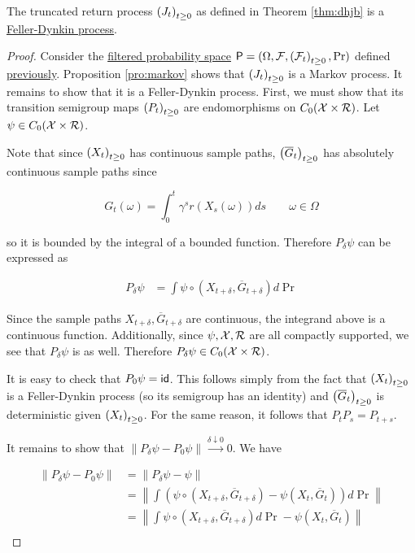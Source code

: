 \begin{lemma}\label{lem:generator}
  The truncated return process $\indexedabove{t}{J}$ as defined in
  Theorem \ref{thm:dhjb} is a \hyperref[def:fd]{Feller-Dynkin process}.
\end{lemma}
\begin{proof}
  Consider the \hyperref[def:filtration]{filtered probability space}
  $\mathsf{P} = (\Omega, \mathcal{F},
  \indexedabove{t}{\mathcal{F}}, \Pr)$ defined
  \hyperref[def:probability-space]{previously}. Proposition
  \ref{pro:markov} shows that $\indexedabove{t}{J}$ is a Markov process. It remains to
  show that it is a Feller-Dynkin process. First, we must show that
  its transition semigroup maps $\indexedabove{t}{P}$ are
  endomorphisms on $C_0(\mathcal{X}\times\returnspace)$. Let
  $\psi\in C_0(\mathcal{X}\times\returnspace)$.

  Note that since $\indexedabove{t}{X}$ has continuous sample paths,
  $\indexedabove{t}{\overline{G}}$ has absolutely continuous sample
  paths since

  \begin{equation*}
    G_t(\omega) = \int_0^t\gamma^sr(X_s(\omega))ds \qquad
    \omega\in\Omega
  \end{equation*}

  so it is bounded by the integral of a bounded function. Therefore
  $P_\delta\psi$ can be expressed as

  \begin{align*}
    P_\delta\psi &= \int \psi\circ (X_{t+\delta}, \overline{G}_{t+\delta})d\Pr
  \end{align*}

  Since the sample paths $X_{t+\delta},\overline{G}_{t+\delta}$ are
  continuous, the integrand above is a continuous
  function. Additionally, since $\psi,\mathcal{X},\returnspace$ are
  all compactly supported, we see that $P_\delta\psi$ is as
  well. Therefore $P_\delta\psi\in C_0(\mathcal{X}\times\returnspace)$.

  It is easy to check that $P_0\psi=\identity$. This follows simply
  from the fact that $\indexedabove{t}{X}$ is a Feller-Dynkin process
  (so its semigroup has an identity) and
  $\indexedabove{t}{\overline{G}}$ is deterministic given
  $\indexedabove{t}{X}$. For the same reason, it follows that $P_tP_s=P_{t+s}$.

  It remains to show that $\|P_\delta\psi - P_0\psi\|\overset{\delta\downarrow
    0}{\longrightarrow} 0$. We have

  \begin{align*}
    \left\|P_\delta\psi - P_0\psi\right\| &= \left\|P_\delta\psi - \psi\right\|\\
    &= \left\|\int\left(\psi\circ(X_{t+\delta},
      \overline{G}_{t+\delta}) - \psi(X_t, \overline{G}_t)\right)d\Pr\right\|\\
    &= \left\|\int\psi\circ(X_{t+\delta},
      \overline{G}_{t+\delta})d\Pr - \psi(X_t, \overline{G}_t)\right\|\\
  \end{align*}


\end{proof}
